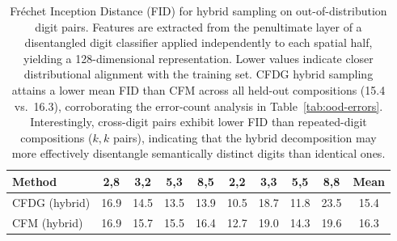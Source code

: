 \begin{table}[t]
\centering
\caption{Fr\'echet Inception Distance (FID) for hybrid sampling on out-of-distribution digit pairs. Features are extracted from the penultimate layer of a disentangled digit classifier applied independently to each spatial half, yielding a 128-dimensional representation. Lower values indicate closer distributional alignment with the training set. CFDG hybrid sampling attains a lower mean FID than CFM across all held-out compositions (15.4 vs.\ 16.3), corroborating the error-count analysis in Table~\ref{tab:ood-errors}. Interestingly, cross-digit pairs exhibit lower FID than repeated-digit compositions ($k{,}k$ pairs), indicating that the hybrid decomposition may more effectively disentangle semantically distinct digits than identical ones.}
\label{tab:fid-hybrid}
\begin{tabular}{lccccccccc}
\toprule
Method & \textbf{2,8} & \textbf{3,2} & \textbf{5,3} & \textbf{8,5} & \textbf{2,2} & \textbf{3,3} & \textbf{5,5} & \textbf{8,8} & Mean \\
\midrule
CFDG (hybrid) & 16.9 & 14.5 & 13.5 & 13.9 & 10.5 & 18.7 & 11.8 & 23.5 & 15.4 \\
CFM (hybrid) & 16.9 & 15.7 & 15.5 & 16.4 & 12.7 & 19.0 & 14.3 & 19.6 & 16.3 \\
\bottomrule
\end{tabular}
\end{table}
